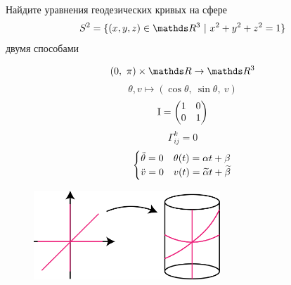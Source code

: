 \documentclass[main]{subfiles}
\begin{document}

    \begin{task}
        Найдите уравнения геодезических кривых на сфере
        \[S^2 = \{(x,y,z) \in \R^3 \ |\ x^2 + y^2 + z^2 = 1\}\]
        двумя способами
    \end{task}

    \begin{Remark}
        \[(0,\ \pi) \times \R \ra \R^3\]
        \[\theta, v \mapsto (\cos \theta,\ \sin \theta,\ v)\]
        \[\RNumb{1} = \begin{pmatrix}
            1 & 0\\
            0 & 1
        \end{pmatrix}\]
        \[\Gamma_{ij}^k = 0\]
        \[\begin{cases}
            \ddot{\theta} = 0 & \theta(t) = \alpha t + \beta\\
            \ddot{v} = 0 & v(t) = \widetilde{\alpha} t + \widetilde{\beta}
        \end{cases}\]
        \begin{figure}[H]
            \includegraphics[width=7cm]{pics/14_1}
            \centering
        \end{figure}
    \end{Remark}
\end{document}
